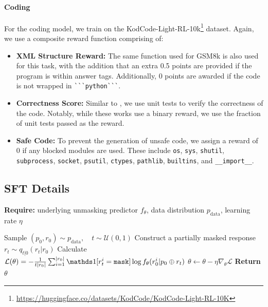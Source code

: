 \paragraph{Coding}
For the coding model, we train on the KodCode-Light-RL-10k\footnote{\url{https://huggingface.co/datasets/KodCode/KodCode-Light-RL-10K}} dataset. Again, we use a composite reward function comprising of:
\begin{itemize}
    \item \textbf{XML Structure Reward:} The same function used for GSM8k is also used for this task, with the addition that an extra 0.5 points are provided if the program is within answer tags. Additionally, 0 points are awarded if the code is not wrapped in \verb|```python```|.
    \item \textbf{Correctness Score:} Similar to \citep{gehring2024rlef, ma2025dynamic}, we use unit tests to verify the correctness of the code. Notably, while these works use a binary reward, we use the fraction of unit tests passed as the reward.
    \item \textbf{Safe Code:} To prevent the generation of unsafe code, we assign a reward of 0 if any blocked modules are used. These include \texttt{os}, \texttt{sys}, \texttt{shutil}, \texttt{subprocess}, \texttt{socket}, \texttt{psutil}, \texttt{ctypes}, \texttt{pathlib}, \texttt{builtins}, and \texttt{\_\_import\_\_}.
\end{itemize}








\subsection{SFT Details}
\label{appendix:sft-design}

\begin{algorithm}[H]
\caption{\textbf{Supervised Finetuning of LLaDA \citep{nie2025largelanguagediffusionmodels}}}
\label{alg:llada_sft}
\textbf{Require:} underlying unmasking predictor $f_{\theta}$, data distribution $p_{\text{data}}$, learning rate $\eta$ \\
\vspace{-1em}
\begin{algorithmic}[1]
\Repeat
    \State Sample $(p_0, r_0) \sim p_{\text{data}}, \quad t \sim \mathcal{U}(0,1)$ 
    \State Construct a partially masked response $r_t \sim q_{t|0}(r_t | r_0)$ 
    \State Calculate $\mathcal{L}(\theta) = -\frac{1}{t |r_0|} \sum_{i=1}^{|r_0|} \indicator[r_t^i = \mask] \log f_{\theta}(r_0^i | p_0 \oplus r_t)$
    \State $\theta \gets \theta - \eta \nabla_{\theta} \mathcal{L}$
\State \textbf{Return} $\theta$
\end{algorithmic}
\end{algorithm}




